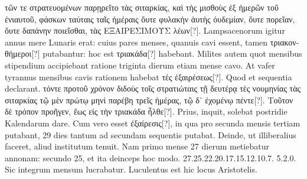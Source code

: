  \textgreek{τῶν τε στρατευομένων
παρῃρεῖτο τὰς σιταρκίας, καὶ τὴς μισθοὺς ἑξ ἡμερῶν τοῦ ἐνιαυτοῦ,
 φάσκων ταύταις
ταῖς ἡμέραις ὄυτε φυλακὴν ἀυτὴς ὀυδεμίαν, ὄυτε πορεῖαν, ὄυτε δαπάνην ποιεῖσθαι,
τὰς ΕΞΑΙΡΕΣΙΜΟΥΣ λέων[?]}.
Lampsacenorum igitur annus
mere Lunaris erat: cuius pares menses, quanuis cavi essent, tamen
\textgreek{τριακονθήμεροι[?]} putabantur: hoc est \textgreek{τριακάδα[?]}
 habebant.
Milites autem
quot mensibus stipendium accipiebant ratione triginta dierum etiam
mense cavo.
At vafer tyrannus mensibus cavis rationem habebat \textgreek{τὲς
ἐξαιρέσεως[?]}.
Quod et sequentia declarant.
\textgreek{τόντε προτοῦ χρόνον διδοὺς τοῖς στρατιώταις
τῇ δευτέρᾳ τὲς νουμηνίας τὰς σιταρκίας τῷ μὲν πρώτῳ μηνὶ παρέβη τρεῖς ἡμέρας,
τῷ δ᾽ ἐχομένῳ πέντε[?]}.
%
\textgreek{Τοῦτον δὲ τρόπον προῆγεν, ἕως  εἰς τὴν τριακάδα
ἦλθε[?]}.
Prius, inquit, solebat postridie Kalendarum dare.
Cum vero esset
\textgreek{ἐξαίρεσις[?]}, in qua pro secunda mensis tertiam putabant,
 29 dies tantum
ad secundam sequentis putabat.
Deinde, ut illiberalius faceret, aliud
institutum tenuit.
Nam primo mense 27 dierum metiebatur annonam:
secundo 25, et ita deinceps hoc modo. 27.25.22.20.17.15.12.10.7.
5.2.0.
Sic integrum mensum lucrabatur.
Luculentus est hic locus
Aristotelis.
